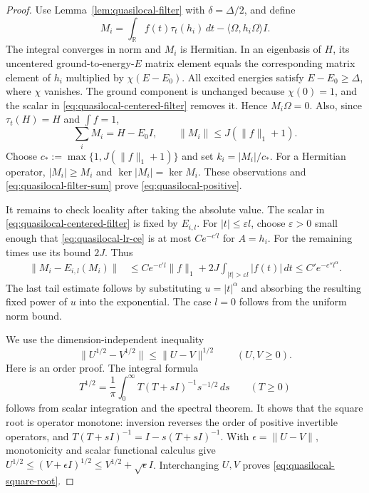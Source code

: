 \begin{proof}
Use Lemma~\ref{lem:quasilocal-filter} with $\delta=\Delta/2$, and define
\begin{equation}
 M_i=\int_{\mathbb R}f(t)\tau_t(h_i)\,dt
             -\langle\Omega,h_i\Omega\rangle I.
 \label{eq:quasilocal-centered-filter}
\end{equation}
The integral converges in norm and $M_i$ is Hermitian.  In an eigenbasis
of $H$, its uncentered ground-to-energy-$E$ matrix element equals the
corresponding matrix element of $h_i$ multiplied by $\chi(E-E_0)$.
All excited energies satisfy $E-E_0\ge\Delta$, where $\chi$ vanishes.
The ground component is unchanged because $\chi(0)=1$, and the scalar
in \eqref{eq:quasilocal-centered-filter} removes it.  Hence $M_i\Omega=0$.
Also, since $\tau_t(H)=H$ and $\int f=1$,
\begin{equation}
 \sum_i M_i=H-E_0I,\qquad
 \|M_i\|\le J(\|f\|_1+1).
 \label{eq:quasilocal-filter-sum}
\end{equation}
Choose $c_*:=\max\{1,J(\|f\|_1+1)\}$ and set $k_i=|M_i|/c_*$.
For a Hermitian operator, $|M_i|\ge M_i$ and
$\ker|M_i|=\ker M_i$.  These observations and
\eqref{eq:quasilocal-filter-sum} prove \eqref{eq:quasilocal-positive}.

It remains to check locality after taking the absolute value.  The scalar
in \eqref{eq:quasilocal-centered-filter} is fixed by $E_{i,l}$.  For
$|t|\le\varepsilon l$, choose $\varepsilon>0$ small enough that
\eqref{eq:quasilocal-lr-ce} is at most $Ce^{-c'l}$ for $A=h_i$.
For the remaining times use its bound $2J$.  Thus
\begin{align}
 \|M_i-E_{i,l}(M_i)\|
 &\le Ce^{-c'l}\|f\|_1
       +2J\int_{|t|>\varepsilon l}|f(t)|\,dt
   \le C'e^{-c''l^\alpha}.
 \label{eq:quasilocal-filter-locality}
\end{align}
The last tail estimate follows by substituting $u=|t|^\alpha$ and
absorbing the resulting fixed power of $u$ into the exponential.  The
case $l=0$ follows from the uniform norm bound.

We use the dimension-independent inequality
\begin{equation}
 \|U^{1/2}-V^{1/2}\|\le\|U-V\|^{1/2}
 \qquad(U,V\ge0).
 \label{eq:quasilocal-square-root}
\end{equation}
Here is an order proof.  The integral formula
\[
 T^{1/2}=\frac1\pi\int_0^\infty
                  T(T+sI)^{-1}s^{-1/2}\,ds\qquad(T\ge0)
\]
follows from scalar integration and the spectral theorem.  It shows that
the square root is operator monotone: inversion reverses the order of
positive invertible operators, and
$T(T+sI)^{-1}=I-s(T+sI)^{-1}$.  With
$\epsilon=\|U-V\|$, monotonicity and scalar functional calculus give
$U^{1/2}\le(V+\epsilon I)^{1/2}\le V^{1/2}+\sqrt\epsilon I$.
Interchanging $U,V$ proves \eqref{eq:quasilocal-square-root}.


\end{proof}
